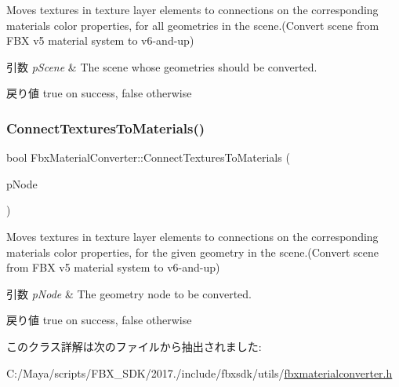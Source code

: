 Moves textures in texture layer elements to connections on the corresponding material\textquotesingle{}s color properties, for all geometries in the scene.(Convert scene from F\+BX v5 material system to v6-\/and-\/up) 
\begin{DoxyParams}{引数}
{\em p\+Scene} & The scene whose geometries should be converted. \\
\hline
\end{DoxyParams}
\begin{DoxyReturn}{戻り値}
true on success, false otherwise 
\end{DoxyReturn}
\mbox{\label{class_fbx_material_converter_a7b1b6da882b2dd935a3e008b2a85b132}} 
\subsubsection{\texorpdfstring{Connect\+Textures\+To\+Materials()}{ConnectTexturesToMaterials()}\hspace{0.1cm}{\footnotesize\ttfamily [2/2]}}
{\footnotesize\ttfamily bool Fbx\+Material\+Converter\+::\+Connect\+Textures\+To\+Materials (\begin{DoxyParamCaption}\item[{\hyperlink{class_fbx_node}{Fbx\+Node} $\ast$}]{p\+Node }\end{DoxyParamCaption})}

Moves textures in texture layer elements to connections on the corresponding material\textquotesingle{}s color properties, for the given geometry in the scene.(Convert scene from F\+BX v5 material system to v6-\/and-\/up) 
\begin{DoxyParams}{引数}
{\em p\+Node} & The geometry node to be converted. \\
\hline
\end{DoxyParams}
\begin{DoxyReturn}{戻り値}
true on success, false otherwise 
\end{DoxyReturn}


このクラス詳解は次のファイルから抽出されました\+:\begin{DoxyCompactItemize}
\item 
C\+:/\+Maya/scripts/\+F\+B\+X\+\_\+\+S\+D\+K/2017./include/fbxsdk/utils/\hyperlink{fbxmaterialconverter_8h}{fbxmaterialconverter.\+h}\end{DoxyCompactItemize}
